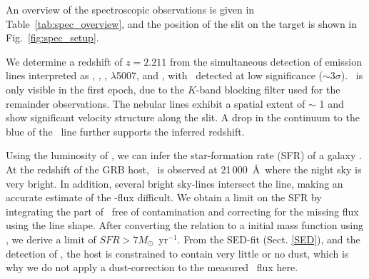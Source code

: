\documentclass{aa}    %
\begin{document}
An overview of the spectroscopic observations is given in Table~\ref{tab:spec_overview}, and the position of the slit on the target is shown in Fig.~\ref{fig:spec_setup}.


We determine a redshift of $z = 2.211$ from the simultaneous detection of
emission lines interpreted as \lya, \oii, \hb, \oiii$\lambda$5007, and \ha, with
\hb~detected at low significance ($\sim 3 \sigma$). \ha~is only visible in the
first epoch, due to the $K$-band blocking filter used for the remainder
observations. The nebular lines exhibit a spatial extent of $\sim$ 1 and
show significant velocity structure along the slit. A drop in the continuum to
the blue of the \lya~line further supports the inferred redshift.


Using the luminosity of \ha, we can infer the star-formation rate (SFR) of a 
galaxy \citep{Kennicutt1998}. At the redshift of the GRB host, \ha~is observed at 
21\,000~\AA~where the night sky is very bright. In addition, several bright sky-lines 
intersect the line, making an accurate estimate of the \ha-flux difficult. 
We obtain a limit on the SFR by integrating the part of \ha~free of contamination and 
correcting for the missing flux using the line shape. After converting the 
\citet{Kennicutt1998} relation to a \citet{Chabrier2003} initial mass function using
\citet{Madau2014}, we derive a limit of $SFR > 7 M_\odot$~yr$^{-1}$. 
From the SED-fit (Sect. \ref{SED}), and the detection of \lya, the host is
constrained to contain very little or no dust, which is why we do not apply 
a dust-correction to the measured \ha~flux here.
\end{document}
